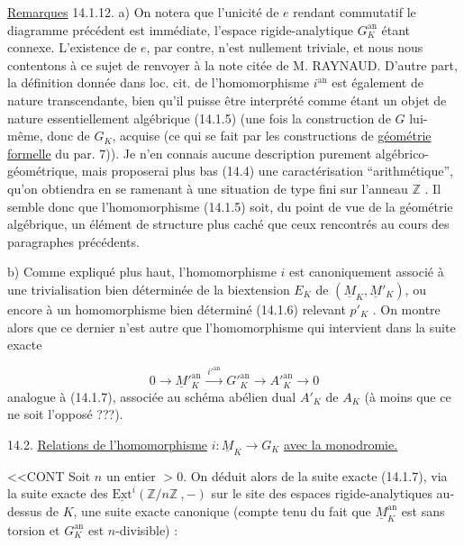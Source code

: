 \underline{Remarques} 14.1.12. a) On notera que l'unicité de $e$ rendant commutatif le diagramme précédent est immédiate, l'espace rigide-analytique $G_K^{\mathrm{an}}$ étant connexe. L'existence de $e$, par contre, n'est nullement triviale, et nous nous contentons à ce sujet de renvoyer à la note citée de M. RAYNAUD. D'autre part, la définition donnée dans loc. cit. de l'homomorphisme $i^{\mathrm{an}}$ est également de nature transcendante, bien qu'il puisse être interprété comme étant un objet de nature essentiellement algébrique (14.1.5) (une fois la construction de $G$ lui-même, donc de $G_K$, acquise (ce qui se fait par les constructions de \underline{géométrie formelle} du par. 7)). Je n'en connais aucune description purement algébrico-géométrique, mais proposerai plus bas (14.4) une caractérisation ``arithmétique'', qu'on obtiendra en se ramenant à une situation de type fini sur l'anneau $\mathbb{Z}$ . Il semble donc que l'homomorphisme (14.1.5) soit, du point de vue de la géométrie algébrique, un élément de structure plus caché que ceux rencontrés au cours des paragraphes précédents.

b) Comme expliqué plus haut, l'homomorphisme $i$ est canoniquement associé à une trivialisation bien déterminée de la biextension $E_K$ de $(\underline{M}_K,\underline{M}'_K)$, ou encore à un homomorphisme bien déterminé (14.1.6) relevant $p'_K$ . On montre alors que ce dernier n'est autre que l'homomorphisme qui intervient dans la suite exacte

\begin{equation}\tag{14.1.13}
0 \longrightarrow \underline{M}'^{\mathrm{an}}_K \xrightarrow{\;i'^{\mathrm{an}}\;} G'^{\mathrm{an}}_K \longrightarrow A'^{\mathrm{an}}_K \longrightarrow 0
\end{equation}
analogue à (14.1.7), associée au schéma abélien dual $A'_K$ de $A_K$ (à moins que ce ne soit l'opposé ???).




14.2. \underline{Relations de l'homomorphisme} $i:\underline{M}_K \longrightarrow G_K$ \underline{avec la monodromie.}

<<CONT Soit $n$ un entier $> 0$. On déduit alors de la suite exacte (14.1.7), via la suite exacte des $\underline{\mathrm{Ext}}^i(\mathbb{Z}/n\mathbb{Z}\ , -)$ sur le site des espaces rigide-analytiques au-dessus de $K$, une suite exacte canonique (compte tenu du fait que $\underline{M}_K^{\mathrm{an}}$ est sans torsion et $G_K^{\mathrm{an}}$ est $n$-divisible) :

